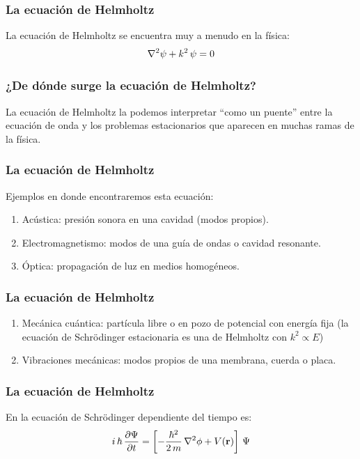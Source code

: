 \documentclass[12pt]{beamer}
\begin{document}
\begin{frame}
\frametitle{La ecuación de Helmholtz}
La ecuación de Helmholtz se encuentra muy a menudo en la física:
\pause
\begin{align*}
\laplacian{\psi} + k^{2} \, \psi = 0
\end{align*}
\end{frame}
\begin{frame}
\frametitle{¿De dónde surge la ecuación de Helmholtz?}
La ecuación de Helmholtz la podemos interpretar \enquote{como un puente} entre la ecuación de onda y los problemas estacionarios que aparecen en muchas ramas de la física.
\end{frame}
\begin{frame}
\frametitle{La ecuación de Helmholtz}
Ejemplos en donde encontraremos esta ecuación:
\pause
{}
\begin{enumerate}[<+->]
\item Acústica: presión sonora en una cavidad (modos propios).
\item Electromagnetismo: modos de una guía de ondas o cavidad resonante.
\item Óptica: propagación de luz en medios homogéneos.
\seti
\end{enumerate}
\end{frame}
\begin{frame}
\frametitle{La ecuación de Helmholtz}
\begin{enumerate}[<+->]
\conti
\item Mecánica cuántica: partícula libre o en pozo de potencial con energía fija (la ecuación de Schrödinger estacionaria es una de Helmholtz con $k^{2} \propto E$)
\item Vibraciones mecánicas: modos propios de una membrana, cuerda o placa.
\end{enumerate}
\end{frame}
\begin{frame}
\frametitle{La ecuación de Helmholtz}
En la ecuación de Schrödinger dependiente del tiempo es:
\pause
\begin{align*}
i \, \hbar \, \pdv{\Psi}{t} = \left[ - \dfrac{\hbar^{2}}{2 \, m} \, \laplacian{\phi} + V (\vb{r}) \right] \, \Psi
\end{align*}
\end{frame}
\end{document}
